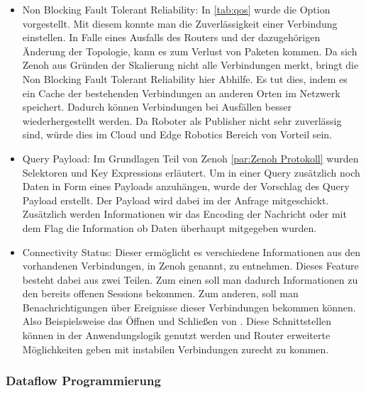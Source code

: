 \begin{itemize}
  \item Non Blocking Fault Tolerant Reliability: In \ref{tab:qos} wurde die  Option vorgestellt. Mit diesem konnte man die Zuverlässigkeit einer Verbindung einstellen. In Falle eines Ausfalls des Routers und der dazugehörigen Änderung der Topologie, kann es zum Verlust von Paketen kommen. Da sich Zenoh aus Gründen der Skalierung nicht alle Verbindungen merkt, bringt die Non Blocking Fault Tolerant Reliability hier Abhilfe. Es tut dies, indem es ein Cache der bestehenden Verbindungen an anderen Orten im Netzwerk speichert. Dadurch können Verbindungen bei Ausfällen besser wiederhergestellt werden. Da Roboter als Publisher nicht sehr zuverlässig sind, würde dies im Cloud und Edge Robotics Bereich von Vorteil sein.
  \item Query Payload: Im Grundlagen Teil von Zenoh \ref{par:Zenoh Protokoll} wurden Selektoren und Key Expressions erläutert. Um in einer Query zusätzlich noch Daten in Form eines Payloads anzuhängen, wurde der Vorschlag des Query Payload erstellt. Der Payload wird dabei im  der Anfrage mitgeschickt. Zusätzlich werden Informationen wir das Encoding der Nachricht oder mit dem Flag  die Information ob Daten überhaupt mitgegeben wurden.
  \item Connectivity Status: Dieser ermöglicht es verschiedene Informationen aus den vorhandenen Verbindungen, in Zenoh  genannt, zu entnehmen. Dieses Feature besteht dabei aus zwei Teilen. Zum einen soll man dadurch Informationen zu den bereits offenen Sessions bekommen. Zum anderen, soll man Benachrichtigungen über Ereignisse dieser Verbindungen bekommen können. Also Beispielsweise das Öffnen und Schließen von . Diese Schnittstellen können in der Anwendungslogik genutzt werden und Router erweiterte Möglichkeiten geben mit instabilen Verbindungen zurecht zu kommen.
\end{itemize}


\subsubsection{Dataflow Programmierung} %
\label{ssub:Dataflow Programmierung}


